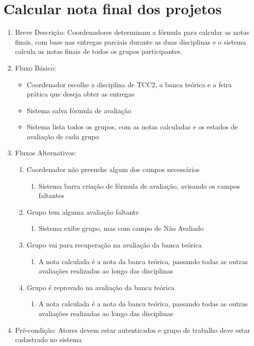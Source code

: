 \section{Calcular nota final dos projetos}
\begin{enumerate}
    \item Breve Descrição: Coordenadores determinam a fórmula para calcular as notas finais, com base nas entregas parciais durante as duas disciplinas e o sistema calcula as notas finais de todos os grupos participantes.
    \item Fluxo Básico:
    \begin{itemize}
        \item Coordenador escolhe a disciplina de TCC2, a banca teórica e a feira prática que deseja obter as entregas
        \item Sistema salva fórmula de avaliação
        \item Sistema lista todos os grupos, com as notas calculadas e os estados de avaliação de cada grupo
    \end{itemize}
    \item Fluxos Alternativos:
    \begin{enumerate}
        \item Coordenador não preenche algum dos campos necessários
        \begin{enumerate}
            \item Sistema barra criação de fórmula de avaliação, avisando os campos faltantes
        \end{enumerate}
        \item Grupo tem alguma avaliação faltante
        \begin{enumerate}
            \item Sistema exibe grupo, mas com campo de Não Avaliado
        \end{enumerate}
        \item Grupo vai para recuperação na avaliação da banca teórica
        \begin{enumerate}
            \item A nota calculada é a nota da banca teórica, passando todas as outras avaliações realizadas ao longo das disciplinas
        \end{enumerate}
        \item Grupo é reprovado na avaliação da banca teórica
        \begin{enumerate}
            \item A nota calculada é a nota da banca teórica, passando todas as outras avaliações realizadas ao longo das disciplinas
        \end{enumerate}
    \end{enumerate}
    \item Pré-condição: Atores devem estar autenticados e grupo de trabalho deve estar cadastrado no sistema
\end{enumerate}